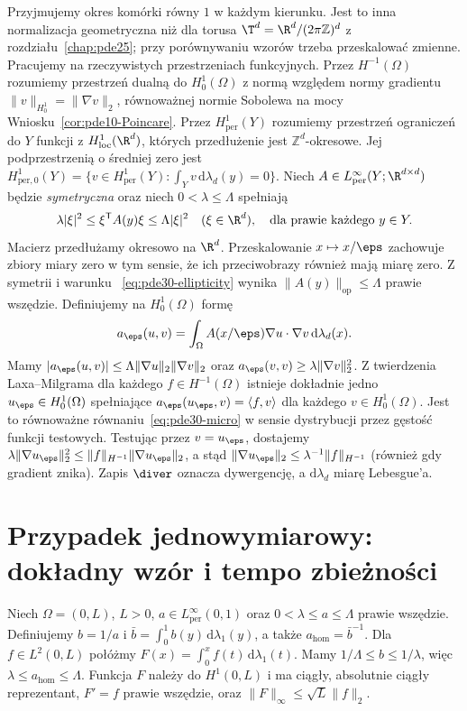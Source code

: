 Przyjmujemy okres komórki równy $1$ w każdym kierunku.
Jest to inna normalizacja geometryczna niż dla torusa
$\T^d=\R^d/(2\pi\mathbb Z)^d$ z rozdziału~\ref{chap:pde25};
przy porównywaniu wzorów trzeba przeskalować zmienne.
Pracujemy na rzeczywistych przestrzeniach funkcyjnych.
Przez $H^{-1}(\Omega)$ rozumiemy przestrzeń dualną
do $H_0^1(\Omega)$ z normą względem normy gradientu
$\|v\|_{H_0^1}=\|\nabla v\|_2$,
równoważnej normie Sobolewa na mocy
Wniosku~\ref{cor:pde10-Poincare}.
Przez $H^1_{\mathrm{per}}(Y)$ rozumiemy przestrzeń ograniczeń do
$Y$ funkcji z $H^1_{\mathrm{loc}}(\R^d)$, których przedłużenie jest
$\mathbb Z^d$-okresowe. Jej podprzestrzenią o średniej zero jest
$H^1_{\mathrm{per},0}(Y)=\{v\in H^1_{\mathrm{per}}(Y):
\int_Yv\,\mathrm d\lambda_d(y)=0\}$.
Niech $A\in L^\infty_{\mathrm{per}}(Y;\R^{d\times d})$ będzie
\emph{symetryczna} oraz niech $0<\lambda\le\Lambda$ spełniają
\begin{equation}\label{eq:pde30-ellipticity}
 \lambda|\xi|^2\le\xi^{\mathsf T}A(y)\xi\le\Lambda|\xi|^2
 \quad (\xi\in\R^d),\quad\text{dla prawie każdego }y\in Y.
\end{equation}
Macierz przedłużamy okresowo na $\R^d$.
Przeskalowanie $x\mapsto x/\eps$ zachowuje zbiory
miary zero w tym sensie, że ich przeciwobrazy
również mają miarę zero. Z symetrii i warunku
~\eqref{eq:pde30-ellipticity} wynika
$\|A(y)\|_{\mathrm{op}}\le\Lambda$ prawie wszędzie.
Definiujemy na $H_0^1(\Omega)$ formę
\[
 a_\eps(u,v)=\int_\Omega A(x/\eps)\nabla u\cdot\nabla v\,
 \mathrm d\lambda_d(x).
\]
Mamy $|a_\eps(u,v)|\le\Lambda\|\nabla u\|_2\|\nabla v\|_2$
oraz $a_\eps(v,v)\ge\lambda\|\nabla v\|_2^2$.
Z twierdzenia Laxa--Milgrama dla każdego $f\in H^{-1}(\Omega)$
istnieje dokładnie jedno $u_\eps\in H_0^1(\Omega)$
spełniające $a_\eps(u_\eps,v)=\langle f,v\rangle$
dla każdego $v\in H_0^1(\Omega)$.
Jest to równoważne równaniu~\eqref{eq:pde30-micro}
w sensie dystrybucji przez gęstość funkcji testowych.
Testując przez $v=u_\eps$, dostajemy
$\lambda\|\nabla u_\eps\|_2^2\le
\|f\|_{H^{-1}}\|\nabla u_\eps\|_2$,
a stąd $\|\nabla u_\eps\|_2\le\lambda^{-1}\|f\|_{H^{-1}}$
(również gdy gradient znika).
Zapis $\diver$ oznacza dywergencję, a $\mathrm d\lambda_d$ miarę Lebesgue'a.

\section{Przypadek jednowymiarowy: dokładny wzór i tempo zbieżności}
Niech $\Omega=(0,L)$, $L>0$, $a\in L^\infty_{\mathrm{per}}(0,1)$
oraz $0<\lambda\le a\le\Lambda$ prawie wszędzie. Definiujemy
$b=1/a$ i $\bar b=\int_0^1b(y)\,\mathrm d\lambda_1(y)$, a także
$a_{\mathrm{hom}}=\bar b^{-1}$. Dla $f\in L^2(0,L)$ połóżmy
$F(x)=\int_0^xf(t)\,\mathrm d\lambda_1(t)$.
Mamy $1/\Lambda\le b\le1/\lambda$, więc
$\lambda\le a_{\mathrm{hom}}\le\Lambda$.
Funkcja $F$ należy do $H^1(0,L)$ i ma ciągły,
absolutnie ciągły reprezentant, $F'=f$ prawie wszędzie,
oraz $\|F\|_\infty\le\sqrt L\|f\|_2$.

